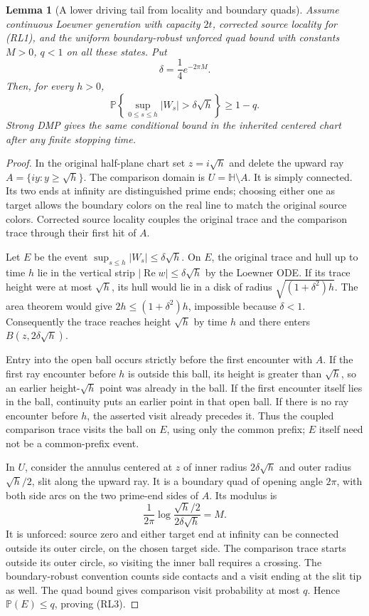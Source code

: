 \documentclass[11pt]{article}
\newtheorem{lemma}[theorem]{Lemma}
\theoremstyle{definition}\newtheorem{definition}[theorem]{Definition}
\theoremstyle{remark}\newtheorem{remark}[theorem]{Remark}
\begin{document}
\begin{lemma}[A lower driving tail from locality and boundary quads]
\label{lem:ray-locality-driver-lower}
Assume continuous Loewner generation with capacity $2t$, corrected
source locality for (RL1), and the uniform boundary-robust unforced
quad bound with constants $M>0$, $q<1$ on all these states.
Put
\[
 \delta=\frac14e^{-2\pi M}.
 \tag{RL2}
\]
Then, for every $h>0$,
\[
 \mathbb P\left\{\sup_{0\le s\le h}|W_s|>
                       \delta\sqrt h\right\}\ge1-q.
 \tag{RL3}
\]
Strong DMP gives the same conditional bound in the inherited centered
chart after any finite stopping time.
\end{lemma}
\begin{proof}
In the original half-plane chart set $z=i\sqrt h$ and delete the
upward ray $A=\{iy:y\ge\sqrt h\}$. The comparison domain is
$U=\mathbb H\setminus A$. It is simply connected. Its two ends at
infinity are distinguished prime ends; choosing either one as target
allows the boundary colors on the real line to match the original
source colors. Corrected source locality couples the original trace
and the comparison trace through their first hit of $A$.

Let $E$ be the event $\sup_{s\le h}|W_s|\le\delta\sqrt h$.
On $E$, the original trace and hull up to time $h$ lie in the vertical
strip $|\operatorname{Re}w|\le\delta\sqrt h$ by the Loewner ODE.
If its trace height were at most $\sqrt h$, its hull would lie in a
disk of radius $\sqrt{(1+\delta^2)h}$. The area theorem would give
$2h\le(1+\delta^2)h$, impossible because $\delta<1$.
Consequently the trace reaches height $\sqrt h$ by time $h$ and
there enters $B(z,2\delta\sqrt h)$.

Entry into the open ball occurs strictly before the first encounter
with $A$. If the first ray encounter before $h$ is outside this ball,
its height is greater than $\sqrt h$, so an earlier height-$\sqrt h$
point was already in the ball. If the first encounter itself lies in
the ball, continuity puts an earlier point in that open ball. If there
is no ray encounter before $h$, the asserted visit already precedes it.
Thus the coupled comparison trace visits the ball on $E$, using only
the common prefix; $E$ itself need not be a common-prefix event.

In $U$, consider the annulus centered at $z$ of inner radius
$2\delta\sqrt h$ and outer radius $\sqrt h/2$, slit along the
upward ray. It is a boundary quad of opening angle $2\pi$, with
both side arcs on the two prime-end sides of $A$. Its modulus is
\[
 \frac1{2\pi}\log\frac{\sqrt h/2}{2\delta\sqrt h}
       =M.
\]
It is unforced: source zero and either target end at infinity can
be connected outside its outer circle, on the chosen target side.
The comparison trace starts outside its outer circle, so visiting
the inner ball requires a crossing. The boundary-robust convention
counts side contacts and a visit ending at the slit tip as well.
The quad bound gives comparison visit probability at most $q$.
Hence $\mathbb P(E)\le q$, proving (RL3).


\end{proof}
\end{document}
